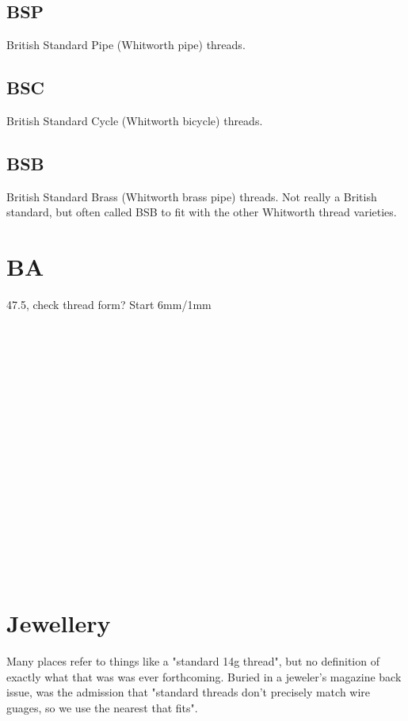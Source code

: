 \subsection{BSP}
British Standard Pipe (Whitworth pipe) threads.
\clearpage

\subsection{BSC}
British Standard Cycle (Whitworth bicycle) threads.
\clearpage

\subsection{BSB}
British Standard Brass (Whitworth brass pipe) threads.  Not really a British standard, but often called BSB to fit with the other Whitworth thread varieties.
\clearpage

\clearpage
\section{BA}
47.5\degree, check thread form?
Start 
6mm/1mm
\\ \\ \\ \\ \\ \\ \\ \\ \\ \\ \\ \\ \\ \\ \\ \\ \\ \\               
                                                                                                                   
\clearpage
\section{Jewellery}
Many places refer to things like a "standard 14g thread", but no definition of exactly what that was was ever forthcoming.  Buried in a jeweler's magazine back issue, was the admission that "standard threads don't precisely match wire guages, so we use the nearest that fits".  

